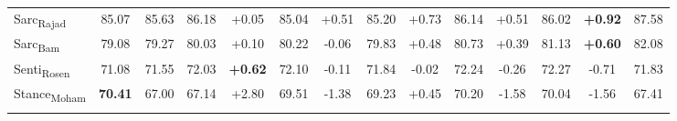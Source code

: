 \begin{table*}[ht]
\begin{tabular}{@{}lcc:cc:cc:cc:cc:cc|c@{}}
Sarc\textsubscript{Rajad}    & 85.07        &       \colorbox{green!10}{85.63}                  & \colorbox{green!10}{86.18}                                   & \colorbox{green!10}{+0.05}                                & 85.04                                   & \colorbox{green!10}{+0.51}                                & \colorbox{green!10}{85.20}                                    & \colorbox{green!10}{+0.73}                                & \colorbox{green!10}{86.14}                                   & \colorbox{green!10}{+0.51}                                & \colorbox{green!10}{86.02}                                   & \colorbox{green!10}{\textbf{+0.92}}            &   87.58                    \\

Sarc\textsubscript{Bam}      & 79.08             &          \colorbox{green!10}{79.27}         & \colorbox{green!10}{80.03}                                   & \colorbox{green!10}{+0.10}                               & \colorbox{green!10}{80.22}                                  & \colorbox{green!10}{-0.06}                               & \colorbox{green!10}{79.83}                                  & \colorbox{green!10}{+0.48}                               & \colorbox{green!10}{80.73}                                  & \colorbox{green!10}{+0.39}                               & \colorbox{green!10}{81.13}                                  & \colorbox{green!10}{\textbf{+0.60}}            &    82.08                    \\

Senti\textsubscript{Rosen}   & 71.08                &           \colorbox{green!10}{71.55}      & \colorbox{green!10}{72.03}                                  & \colorbox{green!10}{\textbf{+0.62}}                               & \colorbox{green!10}{72.10}                                  & \colorbox{green!10}{-0.11}                               & \colorbox{green!10}{71.84}                                  & \colorbox{green!10}{-0.02}                               & \colorbox{green!10}{72.24}                                  & \colorbox{green!10}{-0.26}                               & \colorbox{green!10}{72.27}                                  & \colorbox{green!10}{-0.71}             & 71.83                    \\
Stance\textsubscript{Moham}  & \textbf{70.41}             &   67.00                   & 67.14                                   & +2.80                                & 69.51                                   & -1.38                                & 69.23                                   & +0.45                                & 70.20                                   & -1.58                                & 70.04                                   & -1.56            &   67.41                    \\  


\end{tabular}
\end{table*}
